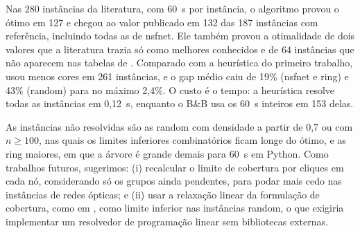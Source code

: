 \documentclass[12pt]{article}
\begin{document}
Nas 280 instâncias da literatura, com 60~s por instância, o algoritmo provou
o ótimo em 127 e chegou ao valor publicado em 132 das 187 instâncias com
referência, incluindo todas as de nsfnet. Ele também provou a otimalidade de
dois valores que a literatura trazia só como melhores conhecidos e de 64
instâncias que não aparecem nas tabelas de \cite{furini2018}. Comparado com a
heurística do primeiro trabalho, usou menos cores em 261 instâncias, e o gap
médio caiu de 19\% (nsfnet e ring) e 43\% (random) para no máximo 2,4\%. O
custo é o tempo: a heurística resolve todas as instâncias em 0,12~s, enquanto
o B\&B usa os 60~s inteiros em 153 delas.

As instâncias não resolvidas são as random com densidade a partir de 0,7 ou
com $n\ge100$, nas quais
os limites inferiores combinatórios ficam longe do ótimo, e as ring maiores,
em que a árvore é grande demais para 60~s em Python. Como trabalhos futuros,
sugerimos: (i) recalcular o limite de cobertura por cliques em cada nó,
considerando só os grupos ainda pendentes, para podar mais cedo nas
instâncias de redes ópticas; e (ii) usar a relaxação linear da formulação de
cobertura, como em \cite{furini2018}, como limite inferior nas instâncias
random, o que exigiria implementar um resolvedor de programação linear sem
bibliotecas externas.



\end{document}
